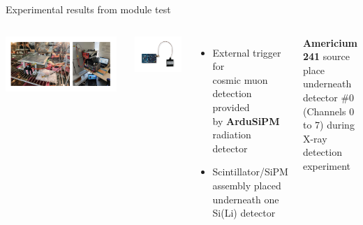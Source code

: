 \documentclass[aspectratio=169,xcolor=dvipsnames,handout]{beamer} %
\begin{document}
\begin{frame}{Experimental results from module test}
\begin{columns}
            \includegraphics[width=0.97\textwidth]{images/muon_detection/foto_modulo_camera.pdf}
            \vspace{0.2cm}
            \begin{columns}
                    \includegraphics[width=1\textwidth]{images/muon_detection/ardusipm_cropped.pdf}
                    \begin{itemize}
                        \item External trigger for\\ cosmic muon detection provided\\ by \textbf{ArduSiPM} radiation detector\vspace{0.1cm}
                        \item Scintillator/SiPM assembly placed underneath one\\ Si(Li) detector
                    \end{itemize}   
            \end{columns}
            \centering
            \vspace{0.3cm}
            \textbf{Americium 241} source place underneath\\ detector \#0 (Channels 0 to 7) during X-ray detection experiment
    \end{columns}
\end{frame}
\end{document}
